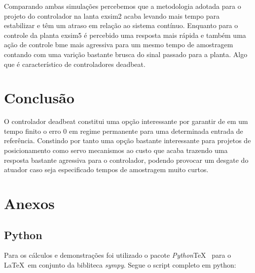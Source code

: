 \documentclass[a4paper,11pt]{article}
\begin{document}
Comparando ambas simulações percebemos que a metodologia adotada para o projeto do controlador na lanta exsim2 acaba levando mais tempo para estabilizar e têm um atraso em relação ao sistema contínuo. Enquanto para o controle da planta exsim5 é percebido uma resposta mais rápida e também uma ação de controle bme mais agressiva para um mesmo tempo de amostragem contando com uma varição bastante brusca do sinal passado para a planta. Algo que é característico de controladores deadbeat.

\section{Conclusão}

O controlador deadbeat constitui uma opção interessante por garantir de em um tempo finito o erro $0$ em regime permanente para uma determinada entrada de referência. Constindo por tanto uma opção bastante interessante para projetos de posicionamento como servo mecanismos ao custo que acaba trazendo uma resposta bastante agressiva para o controlador, podendo provocar um desgate do atuador caso seja especificado tempos de amostragem muito curtos.

\newpage

\nocite{sympy}
\nocite{pythontex}
\nocite{matlabcontrol}
\nocite{matlabsymbolic}
\nocite{ogata2010modern}

\newpage
\section*{Anexos}
\subsection*{Python}

Para os cálculos e demonstrações foi utilizado o pacote \textit{Python}\TeX\ \cite{pythontex} para o \LaTeX\ em conjunto da bibliteca \textit{sympy}\cite{sympy}. Segue o script completo em python:
\end{document}
